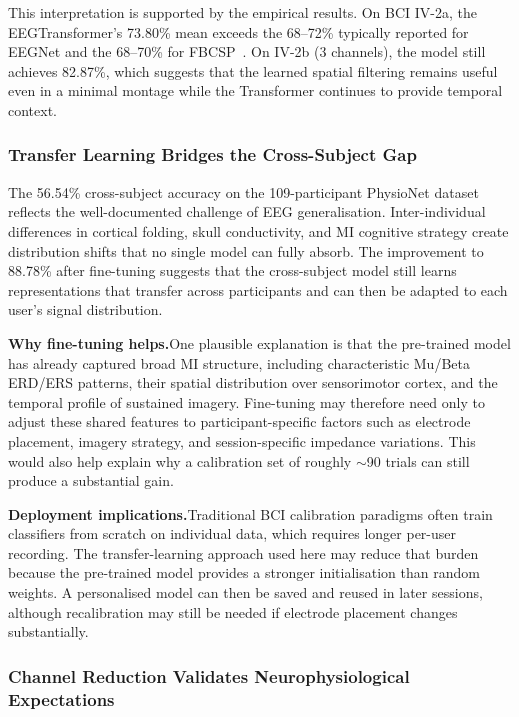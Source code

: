 \documentclass[12pt, a4paper]{article}
\begin{document}
This interpretation is supported by the empirical results. On BCI IV-2a, the EEGTransformer's 73.80\% mean exceeds the 68--72\% typically reported for EEGNet and the 68--70\% for FBCSP~\cite{hameed2025enhancing}. On IV-2b (3 channels), the model still achieves 82.87\%, which suggests that the learned spatial filtering remains useful even in a minimal montage while the Transformer continues to provide temporal context.

\subsubsection{Transfer Learning Bridges the Cross-Subject Gap}

The 56.54\% cross-subject accuracy on the 109-participant PhysioNet dataset reflects the well-documented challenge of EEG generalisation. Inter-individual differences in cortical folding, skull conductivity, and MI cognitive strategy create distribution shifts that no single model can fully absorb. The improvement to 88.78\% after fine-tuning suggests that the cross-subject model still learns representations that transfer across participants and can then be adapted to each user's signal distribution.

\textbf{Why fine-tuning helps.}\quad One plausible explanation is that the pre-trained model has already captured broad MI structure, including characteristic Mu/Beta ERD/ERS patterns, their spatial distribution over sensorimotor cortex, and the temporal profile of sustained imagery. Fine-tuning may therefore need only to adjust these shared features to participant-specific factors such as electrode placement, imagery strategy, and session-specific impedance variations. This would also help explain why a calibration set of roughly $\sim$90 trials can still produce a substantial gain.

\textbf{Deployment implications.}\quad Traditional BCI calibration paradigms often train classifiers from scratch on individual data, which requires longer per-user recording. The transfer-learning approach used here may reduce that burden because the pre-trained model provides a stronger initialisation than random weights. A personalised model can then be saved and reused in later sessions, although recalibration may still be needed if electrode placement changes substantially.

\subsubsection{Channel Reduction Validates Neurophysiological Expectations}
\end{document}
